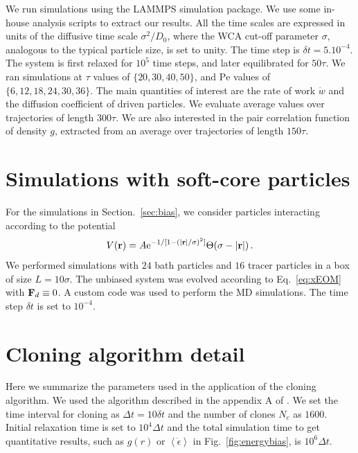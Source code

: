 \documentclass[pre, superscriptaddress, twocolumn,pre]{revtex4-1}
\begin{document}
We run simulations using the LAMMPS simulation package. We use some in-house analysis scripts to extract our results. All the time scales are expressed in units of the diffusive time scale $\sigma^2/D_0$, where the WCA cut-off parameter $\sigma$, analogous to the typical particle size, is set to unity. The time step is $\delta t = 5.10^{-4}$. The system is first relaxed for $10^5$ time steps, and later equilibrated for $50\tau$. We ran simulations at $\tau$ values of $\{20,30,40,50\}$, and $\text{Pe}$ values of $\{6,12,18,24,30,36\}$. The main quantities of interest are the rate of work $\dot w$ and the diffusion coefficient of driven particles. We evaluate average values over trajectories of length $300\tau$. We are also interested in the pair correlation function of density $g$, extracted from an average over trajectories of length $150 \tau$. 

\section{Simulations with soft-core particles}\label{sec:sim2}
For the simulations in Section.~\ref{sec:bias}, we consider particles interacting according to the potential 
\begin{equation}
\label{eq:softcore}
V({\bf r})=A {\rm e}^{-1/[1-(|{\bf r}|/\sigma)^2]}\Theta(\sigma-|{\bf r}|)\,.
\end{equation}
We performed simulations with $24$ bath particles and $16$ tracer particles in a box of size $L=10\sigma$. The unbiased system was evolved according to Eq.~\ref{eq:xEOM} with ${\bf F}_d\equiv 0$. A custom code was used to perform the MD simulations. The time step $\delta t$ is set to $10^{-4}$. 

\section{Cloning algorithm detail}

Here we summarize the parameters used in
the application of the cloning algorithm. 
We used the algorithm described in the appendix A of \cite{Nemoto2016}. We set the time interval for cloning as $\Delta t = 10 \delta t$ and the number of clones $N_c$ as $1600$. Initial relaxation time is set to $10^4\Delta t$ and the total simulation time to get quantitative results, such as $g(r)$ or $\left \langle \dot \epsilon \right \rangle$ in Fig.~\ref{fig:energybias}, is $10^6 \Delta t$. 
\end{document}
